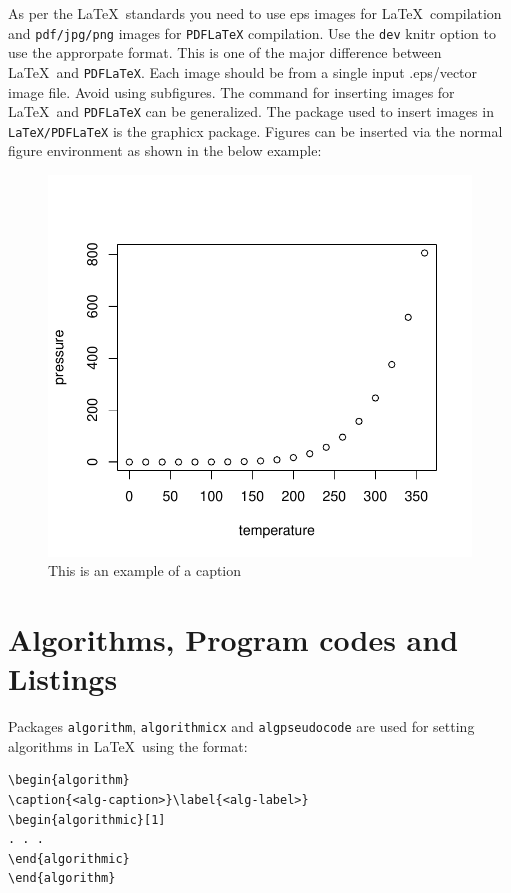 \documentclass[sn-basic,lineno,pdflatex]{sn-jnl}
\theoremstyle{remark}
\theoremstyle{definition}
\begin{document}
As per the \LaTeX~standards you need to use eps images for
\LaTeX~compilation and \texttt{pdf/jpg/png} images for \texttt{PDFLaTeX}
compilation. Use the \texttt{dev} knitr option to use the approrpate
format. This is one of the major difference between \LaTeX~and
\texttt{PDFLaTeX}. Each image should be from a single input .eps/vector
image file. Avoid using subfigures. The command for inserting images for
\LaTeX~and \texttt{PDFLaTeX} can be generalized. The package used to
insert images in \texttt{LaTeX/PDFLaTeX} is the graphicx package.
Figures can be inserted via the normal figure environment as shown in
the below example:

\begin{figure}
\includegraphics{practice_paper_files/figure-latex/fig1-1} \caption{This is an example of a caption}\label{fig:fig1}
\end{figure}

\section{Algorithms, Program codes and Listings}\label{sec7}

Packages \texttt{algorithm}, \texttt{algorithmicx} and
\texttt{algpseudocode} are used for setting algorithms in \LaTeX~using
the format:

\begin{verbatim}
\begin{algorithm}
\caption{<alg-caption>}\label{<alg-label>}
\begin{algorithmic}[1]
. . .
\end{algorithmic}
\end{algorithm}
\end{verbatim}
\end{document}
